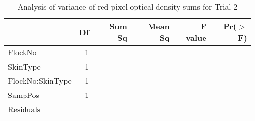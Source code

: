 \begin{table}[ht]
\centering
\caption{Analysis of variance of red pixel optical density sums for Trial 2}
\label{tab:redpixelt2aov}
\begin{tabular}{lrrrrr}
  \hline
 & Df & Sum Sq & Mean Sq & F value & Pr($>$F) \\ 
  \hline
FlockNo & 1 & &  &  &  \\ 
  SkinType & 1 &  &  &  &  \\ 
  FlockNo:SkinType & 1 &  &  &  &  \\ 
  SampPos & 1 & & & & \\
  Residuals &  &  &  &  &  \\ 
   \hline
\end{tabular}
\end{table}

